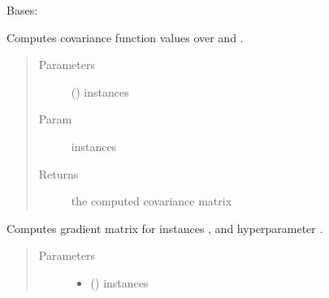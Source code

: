 \documentclass[letterpaper,10pt,english]{sphinxmanual}
\begin{document}
\begin{fulllineitems}
\label{\detokenize{index:bo.covfunc.Matern52}}
Bases: 

\begin{fulllineitems}
\label{\detokenize{index:bo.covfunc.Matern52.cov}}
Computes covariance function values over  and .
\begin{quote}\begin{description}
\item[{Parameters}] \leavevmode
{} (\sphinxstyleliteralemphasis{, }\sphinxstyleliteralemphasis{(}\sphinxstyleliteralemphasis{(}\sphinxstyleliteralemphasis{, }\sphinxstyleliteralemphasis{)}\sphinxstyleliteralemphasis{)}) \textendash{} instances

\item[{Param}] \leavevmode
instances

\item[{Returns}] \leavevmode
the computed covariance matrix

\end{description}\end{quote}

\end{fulllineitems}


\begin{fulllineitems}
\label{\detokenize{index:bo.covfunc.Matern52.grad_matrix}}
Computes gradient matrix for instances ,  and hyperparameter .
\begin{quote}\begin{description}
\item[{Parameters}] \leavevmode\begin{itemize}
\item {} 
 (\sphinxstyleliteralemphasis{, }\sphinxstyleliteralemphasis{(}\sphinxstyleliteralemphasis{(}\sphinxstyleliteralemphasis{, }\sphinxstyleliteralemphasis{)}\sphinxstyleliteralemphasis{)}) \textendash{} instances


\end{itemize}
\end{description}
\end{quote}
\end{fulllineitems}
\end{fulllineitems}
\end{document}

